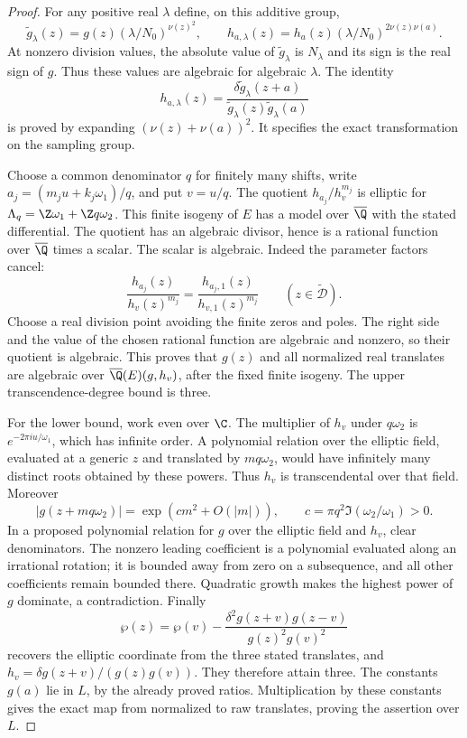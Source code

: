 \begin{proof}
For any positive real $\lambda$ define, on this additive group,
\[
 \widetilde g_\lambda(z)
   =g(z)(\lambda/N_0)^{\nu(z)^2},\qquad
 h_{a,\lambda}(z)
   =h_a(z)(\lambda/N_0)^{2\nu(z)\nu(a)}.
\]
At nonzero division values, the absolute value of
$\widetilde g_\lambda$ is $N_\lambda$ and its sign is the real
sign of $g$. Thus these values are algebraic for algebraic
$\lambda$. The identity
\[
 h_{a,\lambda}(z)=
 \frac{\delta\widetilde g_\lambda(z+a)}
      {\widetilde g_\lambda(z)\widetilde g_\lambda(a)}
\]
is proved by expanding $(\nu(z)+\nu(a))^2$.
It specifies the exact transformation on the sampling group.

Choose a common denominator $q$ for finitely many shifts,
write $a_j=(m_ju+k_j\omega_1)/q$, and put $v=u/q$.
The quotient $h_{a_j}/h_v^{m_j}$ is elliptic for
$\Lambda_q=\Z\omega_1+\Z q\omega_2$. This finite isogeny
of $E$ has a model over $\overline\Q$ with the stated
differential. The quotient has an algebraic divisor, hence
is a rational function over $\overline\Q$ times a scalar.
The scalar is algebraic. Indeed the parameter factors cancel:
\[
 \frac{h_{a_j}(z)}{h_v(z)^{m_j}}
  =\frac{h_{a_j,1}(z)}{h_{v,1}(z)^{m_j}}
       \qquad(z\in\widetilde{\mathcal D}).
\]
Choose a real division point avoiding the finite zeros and poles.
The right side and the value of the chosen rational function
are algebraic and nonzero, so their quotient is algebraic.
This proves that $g(z)$ and all normalized real translates are
algebraic over $\overline\Q(E)(g,h_v)$, after the fixed finite
isogeny. The upper transcendence-degree bound is three.

For the lower bound, work even over $\C$. The multiplier of
$h_v$ under $q\omega_2$ is $e^{-2\pi iu/\omega_1}$,
which has infinite order. A polynomial relation over the elliptic
field, evaluated at a generic $z$ and translated by $mq\omega_2$,
would have infinitely many distinct roots obtained by these
powers. Thus $h_v$ is transcendental over that field. Moreover
\[
 |g(z+mq\omega_2)|=\exp(c m^2+O(|m|)),
 \qquad c=\pi q^2\Im(\omega_2/\omega_1)>0.
\]
In a proposed polynomial relation for $g$ over the elliptic field
and $h_v$, clear denominators. The nonzero leading coefficient
is a polynomial evaluated along an irrational rotation; it is
bounded away from zero on a subsequence, and all other
coefficients remain bounded there. Quadratic growth makes the
highest power of $g$ dominate, a contradiction. Finally
\[
 \wp(z)=\wp(v)-
 \frac{\delta^2g(z+v)g(z-v)}{g(z)^2g(v)^2}
\]
recovers the elliptic coordinate from the three stated translates,
and $h_v=\delta g(z+v)/(g(z)g(v))$. They therefore attain three.
The constants $g(a)$ lie in $L$, by the already proved ratios.
Multiplication by these constants gives the exact map from
normalized to raw translates, proving the assertion over $L$.


\end{proof}
